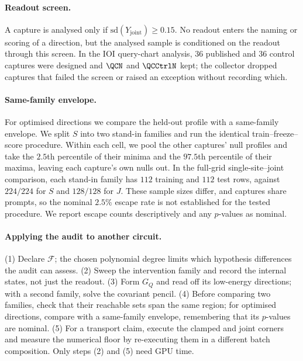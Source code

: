 \paragraph{Readout screen.} A capture is analysed only if $\mathrm{sd}(Y_{\mathrm{joint}})\ge0.15$. No readout enters
the naming or scoring of a direction, but the analysed sample is conditioned on the readout through this screen.
In the IOI query-chart analysis, $36$ published and $36$ control captures were designed and $\QCN$ and $\QCCtrlN$ kept;
the collector dropped captures that failed the screen or raised an exception without recording which.

\paragraph{Same-family envelope.} For optimised directions we compare the held-out profile with a same-family envelope.
We split $S$ into two stand-in families and run the identical train--freeze--score procedure. Within each cell, we
pool the other captures' null profiles and take the $2.5$th percentile of their minima and the $97.5$th percentile
of their maxima, leaving each capture's own nulls out. In the full-grid single-site--joint comparison, each stand-in
family has $112$ training and $112$ test rows, against $224/224$ for $S$ and $128/128$ for $J$. These sample sizes differ,
and captures share prompts, so the nominal $2.5\%$ escape rate is not established for the tested procedure. We report escape counts
descriptively and any $p$-values as nominal.

\paragraph{Applying the audit to another circuit.} (1) Declare $\mathcal F$; the chosen polynomial degree limits which
hypothesis differences the audit can assess. (2) Sweep the intervention family and record the internal states, not just
the readout. (3) Form $G_Q$ and read off its low-energy directions; with a second family, solve the covariant
pencil. (4) Before comparing two families, check that their reachable sets span the same region; for optimised
directions, compare with a same-family envelope, remembering that its $p$-values are nominal. (5) For a transport
claim, execute the clamped and joint corners and measure the numerical floor by re-executing them in a different
batch composition. Only steps (2) and (5) need GPU time.

